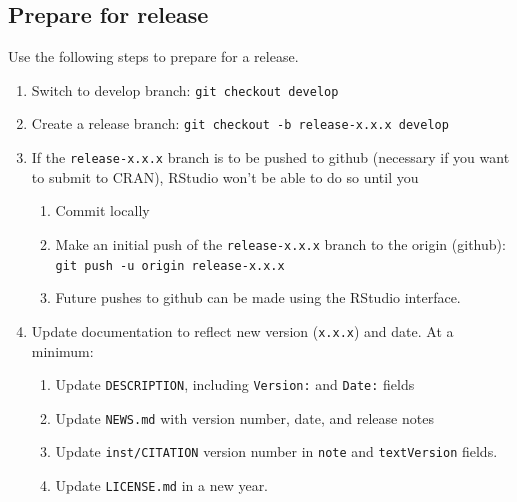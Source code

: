 \documentclass{article}
\begin{document}
\subsection{Prepare for release} 
\label{sec:prep-for-release}

Use the following steps to prepare for a release.

\begin{enumerate}

  \item Switch to develop branch: \texttt{git checkout develop}

  \item Create a release branch: \texttt{git checkout -b release-x.x.x develop} 

  \item If the \texttt{release-x.x.x} branch is to be pushed to github
        (necessary if you want to submit to CRAN), 
        RStudio won't be able to do so until you
  \begin{enumerate}

    \item Commit locally

    \item Make an initial push of the \texttt{release-x.x.x} branch
	      to the origin (github): 
		  \texttt{git push -u origin release-x.x.x} 
	
	\item Future pushes to github can be made using the RStudio interface.

  \end{enumerate}
  \item Update documentation to reflect new version (\texttt{x.x.x}) and date.
        At a minimum:
  \begin{enumerate}

    \item Update \texttt{DESCRIPTION}, including \texttt{Version:} and \texttt{Date:} fields 
	
    \item Update \texttt{NEWS.md} with version number, date, and release notes
    
	\item Update \texttt{inst/CITATION} version number 
	      in \texttt{note} and \texttt{textVersion} fields.
		  
    \item Update \texttt{LICENSE.md} in a new year.
		  

\end{enumerate}
\end{enumerate}
\end{document}
